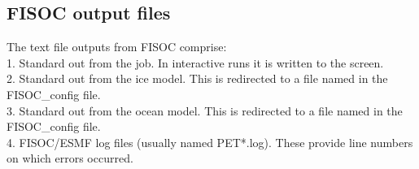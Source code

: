 \documentclass[11pt]{article}
\begin{document}






\subsection{FISOC output files}
\label{sec:output}

The text file  outputs from FISOC comprise: \\
1. Standard out from the job.  In interactive runs it is written to the screen. \\
2. Standard out from the ice model.  This is redirected to a file named in the FISOC\_config file. \\
3. Standard out from the ocean model.  This is redirected to a file named in the FISOC\_config file. \\
4. FISOC/ESMF log files (usually named PET*.log). These provide line numbers on which errors occurred.
\end{document}
